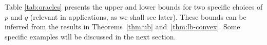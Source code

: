 Table \ref{tab:oracles} presents the upper and lower bounds for two specific choices of $p$ and $q$ (relevant in applications, as we shall see later). These bounds can be inferred from the results in Theorems~\ref{thm:ub} and~\ref{thm:lb-convex}.
Some specific examples will be discussed in the next section.


